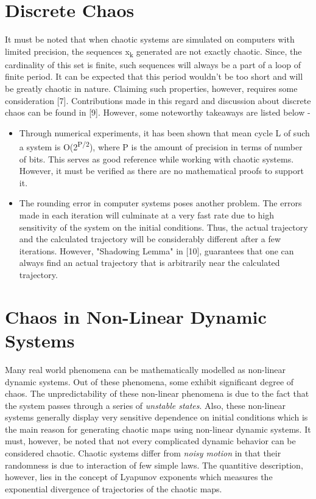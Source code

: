\section{Discrete Chaos}
It must be noted that when chaotic systems are simulated on computers with limited precision, the sequences x\textsubscript{k} generated are not exactly chaotic. Since, the cardinality of this set is finite, such sequences will always be a part of a loop of finite period. It can be expected that this period wouldn't be too short and will be greatly chaotic in nature. Claiming such properties, however, requires some consideration [7]. Contributions made in this regard and discussion about discrete chaos can be found in [9]. However, some noteworthy takeaways are listed below -
\begin{itemize}
\item Through numerical experiments, it has been shown that mean cycle L of such a system is O(2\textsuperscript{P/2}), where P is the amount of precision in terms of number of bits. This serves as good reference while working with chaotic systems. However, it must be verified as there are no mathematical proofs to support it.
\item The rounding error in computer systems poses another problem. The errors made in each iteration will culminate at a very fast rate due to high sensitivity of the system on the initial conditions. Thus, the actual trajectory and the calculated trajectory will be considerably different after a few iterations. However, "Shadowing Lemma" in [10], guarantees that one can always find an actual trajectory that is arbitrarily near the calculated trajectory.
\end{itemize}

\section{Chaos in Non-Linear Dynamic Systems}
Many real world phenomena can be mathematically modelled as non-linear dynamic systems. Out of these phenomena, some exhibit significant degree of chaos. The unpredictability of these non-linear phenomena is due to the fact that the system passes through a series of {\em unstable states}. Also, these non-linear systems generally display very sensitive dependence on initial conditions which is the main reason for generating chaotic maps using non-linear dynamic systems. It must, however, be noted that not every complicated dynamic behavior can be considered chaotic. Chaotic systems differ from {\em noisy motion} in that their randomness is due to interaction of few simple laws. The quantitive description, however, lies in the concept of Lyapunov exponents which measures the exponential divergence of trajectories of the chaotic maps. 

